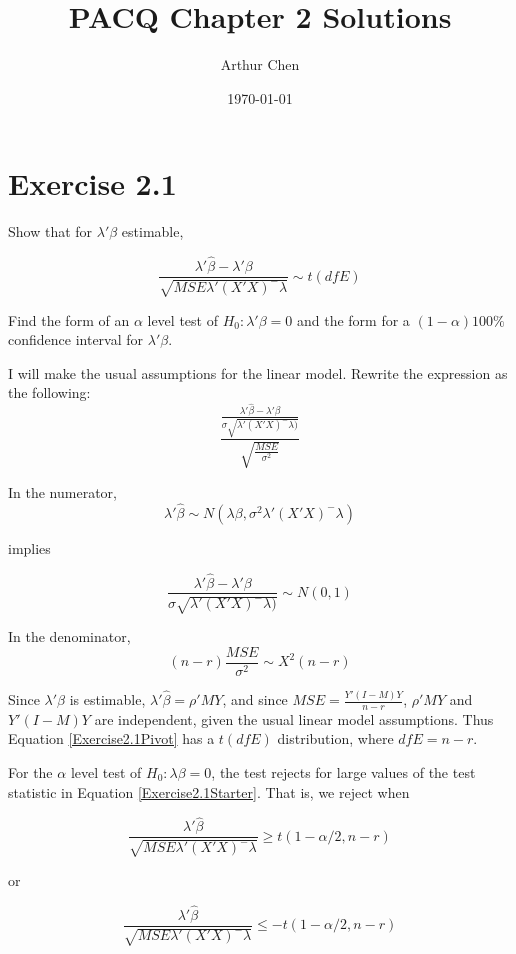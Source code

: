 \documentclass{article}
\author{Arthur Chen}
\title{PACQ Chapter 2 Solutions}
\date{\today}
\begin{document}
\maketitle

\section*{Exercise 2.1}

Show that for $\lambda'\beta$ estimable,

\begin{equation}
\label{Exercise2.1Starter}
\frac{\lambda'\hat{\beta} - \lambda'\beta}{
\sqrt{MSE\lambda'(X'X)^-\lambda}
} \sim t(dfE)
\end{equation}

Find the form of an $\alpha$ level test of $H_0: \lambda'\beta = 0$ and the form for a $(1-\alpha)100\%$ confidence interval for $\lambda'\beta$.

I will make the usual assumptions for the linear model. Rewrite the expression as the following:
\begin{equation}
\label{Exercise2.1Pivot}
\frac{
\frac{\lambda'\hat{\beta} - \lambda'\beta}{
\sigma \sqrt{\lambda'(X'X)^-\lambda)}
}
}{
\sqrt{\frac{MSE}{\sigma^2}}
}
\end{equation}

In the numerator,
\[
\lambda'\hat{\beta} \sim N(\lambda\beta, \sigma^2\lambda'(X'X)^-\lambda)
\]

implies

\[
\frac{\lambda'\hat{\beta} - \lambda'\beta}{
\sigma \sqrt{\lambda'(X'X)^-\lambda)}} \sim N(0, 1)
\]

In the denominator,
\[
(n-r)\frac{MSE}{\sigma^2} \sim X^2(n-r)
\]

Since $\lambda'\beta$ is estimable, $\lambda'\hat{\beta} = \rho'MY$, and since $MSE = \frac{Y'(I-M)Y}{n-r}$, $\rho'MY$ and $Y'(I-M)Y$ are independent, given the usual linear model assumptions. Thus Equation \ref{Exercise2.1Pivot} has a $t(dfE)$ distribution, where $dfE = n-r$.

For the $\alpha$ level test of $H_0: \lambda\beta = 0$, the test rejects for large values of the test statistic in Equation \ref{Exercise2.1Starter}. That is, we reject when

\[
\frac{\lambda'\hat{\beta}}{
\sqrt{MSE\lambda'(X'X)^-\lambda}
} \geq t(1-\alpha/2, n-r)
\]

or

\[
\frac{\lambda'\hat{\beta}}{
\sqrt{MSE\lambda'(X'X)^-\lambda}
} \leq -t(1-\alpha/2, n-r)
\]
\end{document}
